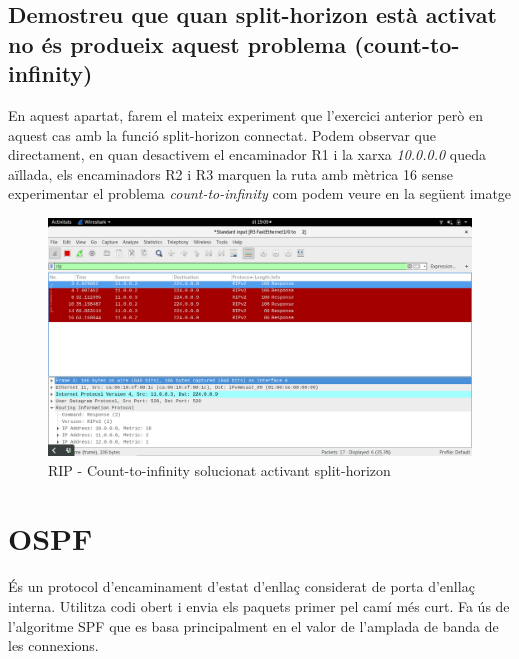 \documentclass[10pt]{article}
\begin{document}
\subsection{Demostreu que quan split-horizon està activat no és produeix aquest problema (count-to-infinity)}
En aquest apartat, farem el mateix experiment que l'exercici anterior però en aquest cas amb la funció split-horizon connectat. Podem observar que directament, en quan desactivem el encaminador R1 i la xarxa \textit{10.0.0.0} queda aïllada, els encaminadors R2 i R3 marquen la ruta amb mètrica 16 sense experimentar el problema \textit{count-to-infinity} com podem veure en la següent imatge
\begin{figure}[H]
\begin{center}
\includegraphics[scale=0.3]{Images/RIP-exercici5.png}
\caption{RIP - Count-to-infinity solucionat activant split-horizon}
\end{center}
\end{figure}
\section{OSPF}
És un protocol d'encaminament d'estat d'enllaç considerat de porta d'enllaç interna. Utilitza codi obert i envia els paquets primer pel camí més curt. Fa ús de l'algoritme SPF que es basa principalment en el valor de l'amplada de banda de les connexions.
\end{document}
